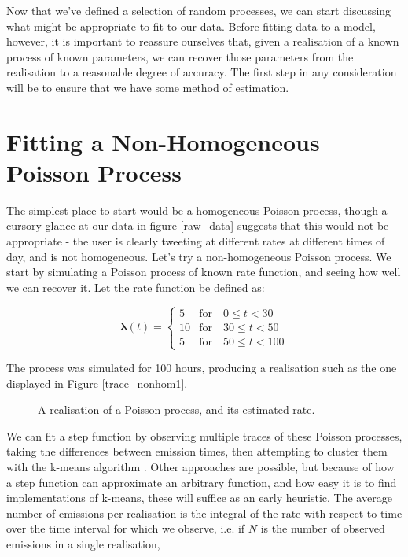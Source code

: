Now that we've defined a selection of random processes, we can start discussing what might be appropriate to fit to our data. Before fitting data to a model, however, it is important to reassure ourselves that, given a realisation of a known process of known parameters, we can recover those parameters from the realisation to a reasonable degree of accuracy. The first step in any consideration will be to ensure that we have some method of estimation.

\section{Fitting a Non-Homogeneous Poisson Process}

The simplest place to start would be a homogeneous Poisson process, though a cursory glance at our data in figure \ref{raw_data} suggests that this would not be appropriate - the user is clearly tweeting at different rates at different times of day, and is not homogeneous. Let's try a non-homogeneous Poisson process. We start by simulating a Poisson process of known rate function, and seeing how well we can recover it. Let the rate function be defined as:

$$
\bm{\lambda}(t) = 
\begin{cases}
5  & \mbox{for} \quad 0  \leqslant t < 30\\
10 & \mbox{for} \quad 30 \leqslant t < 50\\
5  & \mbox{for} \quad 50 \leqslant t < 100
\end{cases}
$$

The process was simulated for 100 hours, producing a realisation such as the one displayed in Figure \ref{trace_nonhom1}.
\begin{figure}
\centering
{}
\caption{A realisation of a Poisson process, and its estimated rate.}

\end{figure}
We can fit a step function by observing multiple traces of these Poisson processes, taking the differences between emission times, then attempting to cluster them with the k-means algorithm \cite{kmeans}. Other approaches are possible, but because of how a step function can approximate an arbitrary function, and how easy it is to find implementations of k-means, these will suffice as an early heuristic. The average number of emissions per realisation is the integral of the rate with respect to time over the time interval for which we observe, i.e. if $N$ is the number of observed emissions in a single realisation,

